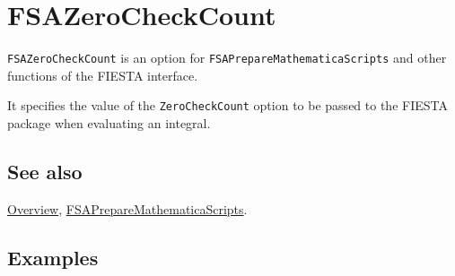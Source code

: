 \documentclass[../FeynHelpersManual.tex]{subfiles}
\begin{document}
\begin{Shaded}
\begin{Highlighting}[]
 
\end{Highlighting}
\end{Shaded}

\hypertarget{fsazerocheckcount}{
\section{FSAZeroCheckCount}\label{fsazerocheckcount}}

\texttt{FSAZeroCheckCount} is an option for
\texttt{FSAPrepareMathematicaScripts} and other functions of the FIESTA
interface.

It specifies the value of the \texttt{ZeroCheckCount} option to be
passed to the FIESTA package when evaluating an integral.

\subsection{See also}

\hyperlink{toc}{Overview},
\hyperlink{fsapreparemathematicascripts}{FSAPrepareMathematicaScripts}.

\subsection{Examples}
\end{document}
